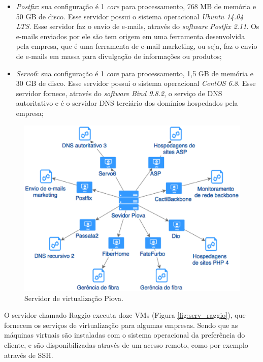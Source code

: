 \begin{itemize}
 \item \textit{Postfix}: sua configuração é 1 \textit{core} para processamento, 768 MB de memória e 50 GB de disco. Esse servidor possui o 
 sistema operacional \textit{Ubuntu 14.04 \ac{LTS}}. Esse servidor faz o envio de e-mails, através do \textit{software} \textit{Postfix 2.11}.
 Os e-mails enviados por ele são tem origem em uma ferramenta desenvolvida pela empresa, que é uma ferramenta de e-mail marketing, ou seja, 
 faz o envio de e-mails em massa para divulgação de informações ou produtos;
 
 \item \textit{Servo6}: sua configuração é 1 \textit{core} para processamento, 1,5 GB de memória e 30 GB de disco. Esse servidor possui o 
 sistema operacional \textit{CentOS 6.8}. Esse servidor fornece, através do \textit{software} \textit{Bind 9.8.2}, o serviço de \ac{DNS} 
 autoritativo e é o servidor \ac{DNS} terciário dos domínios hospedados pela empresa;
\end{itemize}

\begin{figure}[h!]
 \centering
 \includegraphics[width=430px]{img/serv_piova.eps}
 \caption{Servidor de virtualização Piova.}
 \label{fig:serv_piova}
\end{figure}

O servidor chamado Raggio executa doze \ac{VM}s (Figura \ref{fig:serv_raggio}), que fornecem os serviços de virtualização para algumas empresas. Sendo que as máquinas virtuais
são instaladas com o sistema operacional da preferência do cliente, e são disponibilizadas através de um acesso remoto, como por exemplo através
de \ac{SSH}.

